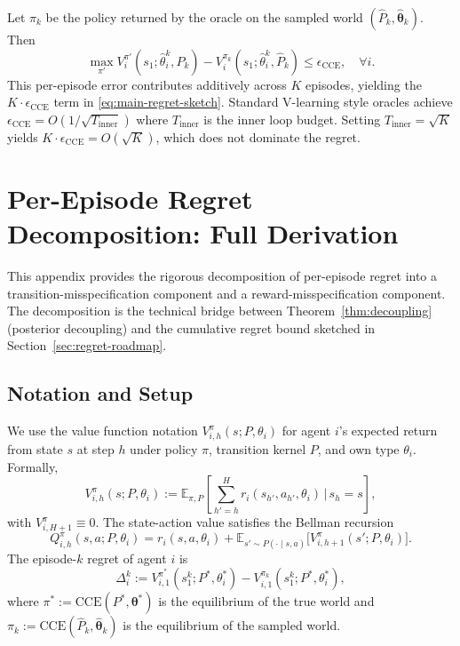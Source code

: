 \documentclass{article}
\begin{document}
Let $\pi_k$ be the policy returned by the oracle on the sampled world $(\hat{P}_k, \hat{\boldsymbol{\theta}}_k)$. Then
\begin{equation}
\max_{\pi'} V_i^{\pi'}(s_1; \hat{\theta}_i^k, \hat{P}_k) - V_i^{\pi_k}(s_1; \hat{\theta}_i^k, \hat{P}_k) \leq \epsilon_{\mathrm{CCE}}, \quad \forall i.
\end{equation}
This per-episode error contributes additively across $K$ episodes, yielding the $K \cdot \epsilon_{\mathrm{CCE}}$ term in \eqref{eq:main-regret-sketch}. Standard V-learning style oracles \citep{jin2021v} achieve $\epsilon_{\mathrm{CCE}} = O(1/\sqrt{T_{\mathrm{inner}}})$ where $T_{\mathrm{inner}}$ is the inner loop budget. Setting $T_{\mathrm{inner}} = \sqrt{K}$ yields $K \cdot \epsilon_{\mathrm{CCE}} = O(\sqrt{K})$, which does not dominate the regret.

\section{Per-Episode Regret Decomposition: Full Derivation}
\label{app:regret-decomp}

This appendix provides the rigorous decomposition of per-episode regret into a transition-misspecification component and a reward-misspecification component. The decomposition is the technical bridge between Theorem~\ref{thm:decoupling} (posterior decoupling) and the cumulative regret bound sketched in Section~\ref{sec:regret-roadmap}.

\subsection{Notation and Setup}

We use the value function notation $V_{i,h}^\pi(s; P, \theta_i)$ for agent $i$'s expected return from state $s$ at step $h$ under policy $\pi$, transition kernel $P$, and own type $\theta_i$. Formally,
\begin{equation}
V_{i,h}^\pi(s; P, \theta_i) := \mathbb{E}_{\pi, P}\left[\sum_{h'=h}^{H} r_i(s_{h'}, a_{h'}, \theta_i) \,\Big|\, s_h = s\right],
\end{equation}
with $V_{i,H+1}^\pi \equiv 0$. The state-action value satisfies the Bellman recursion
\begin{equation}
Q_{i,h}^\pi(s, a; P, \theta_i) = r_i(s, a, \theta_i) + \mathbb{E}_{s' \sim P(\cdot \mid s, a)}\big[V_{i,h+1}^\pi(s'; P, \theta_i)\big].
\end{equation}
The episode-$k$ regret of agent $i$ is
\begin{equation}
\label{eq:Delta-def}
\Delta_i^k := V_{i,1}^{\pi^*}(s_1^k; P^*, \theta_i^*) - V_{i,1}^{\pi_k}(s_1^k; P^*, \theta_i^*),
\end{equation}
where $\pi^* := \mathrm{CCE}(P^*, \boldsymbol{\theta}^*)$ is the equilibrium of the true world and $\pi_k := \mathrm{CCE}(\hat{P}_k, \hat{\boldsymbol{\theta}}_k)$ is the equilibrium of the sampled world.
\end{document}
